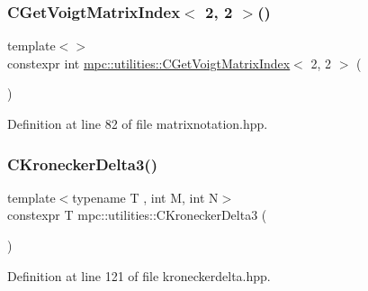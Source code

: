 \mbox{\label{namespacempc_1_1utilities_a519182cb74988fa0a719633a416b07f6}} 
\subsubsection{\texorpdfstring{C\+Get\+Voigt\+Matrix\+Index$<$ 2, 2 $>$()}{CGetVoigtMatrixIndex< 2, 2 >()}}
{\footnotesize\ttfamily template$<$$>$ \\
constexpr int \mbox{\hyperlink{namespacempc_1_1utilities_ad2c3679a8e007d8b5a333490886ef19d}{mpc\+::utilities\+::\+C\+Get\+Voigt\+Matrix\+Index}}$<$ 2, 2 $>$ (\begin{DoxyParamCaption}{ }\end{DoxyParamCaption})\hspace{0.3cm}{\ttfamily [inline]}}



Definition at line 82 of file matrixnotation.\+hpp.

\mbox{\label{namespacempc_1_1utilities_a15cbef577663b27df8b958056104d5d9}} 
\subsubsection{\texorpdfstring{C\+Kronecker\+Delta3()}{CKroneckerDelta3()}}
{\footnotesize\ttfamily template$<$typename T , int M, int N$>$ \\
constexpr T mpc\+::utilities\+::\+C\+Kronecker\+Delta3 (\begin{DoxyParamCaption}{ }\end{DoxyParamCaption})}



Definition at line 121 of file kroneckerdelta.\+hpp.

\mbox{\label{namespacempc_1_1utilities_adbffd8dee20ff121f91cf6be9e19a1b3}} 
